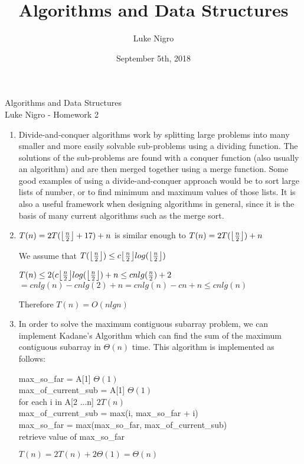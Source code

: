 \documentclass{article}
\author{Luke Nigro}
\title{Algorithms and Data Structures}
\date{September 5th, 2018}
\DeclarePairedDelimiter\floor{\lfloor}{\rfloor}
\begin{document}
\centering \Huge Algorithms and Data Structures \\
\Large Luke Nigro - Homework 2 \\
\begin{flushleft}
\begin{enumerate}
\setlength\itemsep{2em}

\item
Divide-and-conquer algorithms work by splitting large problems into many smaller and more easily solvable sub-problems using a dividing function. The solutions of the sub-problems are found with a conquer function (also usually an algorithm) and are then merged together using a merge function. Some good examples of using a divide-and-conquer approach would be to sort large lists of number, or to find minimum and maximum values of those lists. It is also a useful framework when designing algorithms in general, since it is the basis of many current algorithms such as the merge sort.
\item
$T(n) = 2T(\floor*{\frac{n}{2}} + 17 ) + n$ is similar enough to $T(n) = 2T(\floor*{\frac{n}{2}}) + n$\par
\bigskip
We assume that $T(\floor*{\frac{n}{2}}) \leq c \floor*{\frac{n}{2}}log(\floor*{\frac{n}{2}})$ \par
\bigskip
$T(n) \leq 2(c \floor*{\frac{n}{2}}log(\floor*{\frac{n}{2}}) + n \leq cnlg(\frac{n}{2}) + 2 $\\
$= cnlg(n) - cnlg(2) + n= cnlg(n) - cn + n \leq cnlg(n)$\par
\bigskip
Therefore $T(n) = O(nlgn)$

\item
In order to solve the maximum contiguous subarray problem, we can implement Kadane's Algorithm which can find the sum of the maximum contiguous subarray in $\Theta{(n)}$ time.
This algorithm is implemented as follows:\par
\bigskip
max\_so\_far = A[1] \quad \quad\quad \quad \quad \quad $\Theta(1)$\\
max\_of\_current\_sub = A[1] \quad \quad $\Theta(1)$\\
\quad for each i in A[2 ...n] \quad \quad\quad \quad  $2T(n)$\\
\quad \quad max\_of\_current\_sub = max(i, max\_so\_far + i)\\
\quad \quad max\_so\_far = max(max\_so\_far, max\_of\_current\_sub)\\
retrieve value of max\_so\_far\par
\bigskip
$T(n) = 2T(n) + 2\Theta(1) = \Theta(n)$

\end{enumerate}
\end{flushleft}
\end{document}
